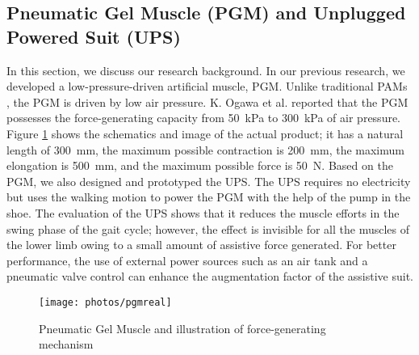 \documentclass[paper,JRM,paper]{jaciiiarticle}
\begin{document}
\subsection{Pneumatic Gel Muscle (PGM) and Unplugged Powered Suit (UPS)}
In this section, we discuss our research background. In our previous research\cite{11}, we developed a low-pressure-driven artificial muscle, PGM. Unlike traditional PAMs \cite{11}, the PGM is driven by low air pressure. K. Ogawa et al. reported that the PGM possesses the force-generating capacity from \SI{50}{\kilo\pascal} to \SI{300}{\kilo\pascal} of air pressure. Figure \ref{fig:pgmreal} shows the schematics and image of the actual product; it has a natural length of \SI{300}{\milli\meter}, the maximum possible contraction is \SI{200}{\milli\meter}, the maximum elongation is \SI{500}{\milli\meter}, and the maximum possible force is \SI{50}{\newton}. Based on the PGM, we also designed and prototyped the UPS. The UPS requires no electricity but uses the walking motion to power the PGM with the help of the pump in the shoe. The evaluation of the UPS shows that it reduces the muscle efforts in the swing phase of the gait cycle; however, the effect is invisible for all the muscles of the lower limb owing to a small amount of assistive force generated. For better performance, the use of external power sources such as an air tank and a pneumatic valve control can enhance the augmentation factor of the assistive suit. 

\begin{figure}
	\centering
	\texttt{[image: photos/pgmreal]}
	\caption{Pneumatic Gel Muscle and illustration of force-generating mechanism}
	\label{fig:pgmreal}
\end{figure}
\end{document}
